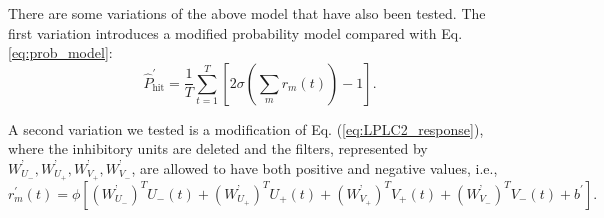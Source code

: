 \documentclass[9pt,lineno]{elife}
\newcommand{\mc}{\mathcal}
\newcommand{\mb}{\mathbb}
\newcommand{\sigmoid}{\text{sigmoid}}
\newcommand{\relu}{\text{\small\sc ReLU}}
\let\hat\widehat
\DeclareMathOperator*{\trace}{tr}
\begin{document}
There are some variations of the above model that have also been tested. The first variation introduces a modified probability model compared with Eq. \ref{eq:prob_model}:
\begin{equation}
\hat{P}^{'}_{\text{hit}} = \frac{1}{T}\sum_{t=1}^{T}\left[ 2\sigma \left( \sum_{m}r_{m}(t) \right)-1 \right].
\label{eq:prob_model2}
\end{equation}

A second variation we tested is a modification of Eq. (\ref{eq:LPLC2_response}), where the inhibitory units are deleted and the filters, represented by $W^{\text{'}}_{U_{-}},W^{\text{'}}_{U_{+}},W^{\text{'}}_{V_{+}},W^{\text{'}}_{V_{-}}$, are allowed to have both positive and negative values, i.e.,
\begin{equation}
r_{m}^{'}(t) = \phi \left[ (W^{\text{'}}_{U_{-}})^{T}U_{-}(t)+(W^{\text{'}}_{U_{+}})^{T}U_{+}(t)+(W^{\text{'}}_{V_{+}})^{T}V_{+}(t)+(W^{\text{'}}_{V_{-}})^{T}V_{-}(t)+b^{'} \right].
\label{eq:LPLC2_response_2}
\end{equation}





\end{document}
